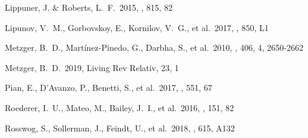\documentclass[twocolumn]{aastex63}
\begin{document}
\begin{thebibliography}{}

 Lippuner, J. \& Roberts, L.~F.\ 2015, \apj, 815, 82


 Lipunov, V.~M., Gorbovskoy, E., Kornilov, V.~G., et al.\ 2017, \apjl, 850, L1



 Metzger, B.~D., Mart{\'i}nez-Pinedo, G., Darbha, S., et al.\ 2010, \mnras, 406, 4, 2650-2662


 Metzger, B.~D.\ 2019, Living Rev Relativ, 23, 1

 Pian, E., D'Avanzo, P., Benetti, S., et al.\ 2017, \nat, 551, 67



 Roederer, I.~U., Mateo, M., Bailey, J.~I., et al.\ 2016, \aj, 151, 82



 Rosswog, S., Sollerman, J., Feindt, U., et al.\ 2018, \aap, 615, A132




\end{thebibliography}
\end{document}
